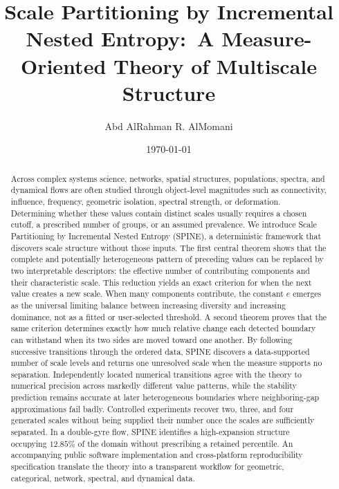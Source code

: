 \documentclass[aip,cha,reprint,superscriptaddress,floatfix]{revtex4-2}
\theoremstyle{definition}
\theoremstyle{remark}
\begin{document}
\title{Scale Partitioning by Incremental Nested Entropy:\ A Measure-Oriented Theory of Multiscale Structure}

\author{Abd AlRahman R. AlMomani}
\date{\today}

\begin{abstract}
Across complex systems science, networks, spatial structures, populations, spectra, and dynamical flows are often studied through object-level magnitudes such as connectivity, influence, frequency, geometric isolation, spectral strength, or deformation. Determining whether these values contain distinct scales usually requires a chosen cutoff, a prescribed number of groups, or an assumed prevalence. We introduce Scale Partitioning by Incremental Nested Entropy (SPINE), a deterministic framework that discovers scale structure without those inputs. The first central theorem shows that the complete and potentially heterogeneous pattern of preceding values can be replaced by two interpretable descriptors: the effective number of contributing components and their characteristic scale. This reduction yields an exact criterion for when the next value creates a new scale. When many components contribute, the constant \(e\) emerges as the universal limiting balance between increasing diversity and increasing dominance, not as a fitted or user-selected threshold. A second theorem proves that the same criterion determines exactly how much relative change each detected boundary can withstand when its two sides are moved toward one another. 
By following successive transitions through the ordered data, SPINE discovers a data-supported number of scale levels and returns one unresolved scale when the measure supports no separation.
Independently located numerical transitions agree with the theory to numerical precision across markedly different value patterns, while the stability prediction remains accurate at later heterogeneous boundaries where neighboring-gap approximations fail badly. Controlled experiments recover two, three, and four generated scales without being supplied their number once the scales are sufficiently separated. In a double-gyre flow, SPINE identifies a high-expansion structure occupying \(12.85\%\) of the domain without prescribing a retained percentile. An accompanying public software implementation and cross-platform reproducibility specification translate the theory into a transparent workflow for geometric, categorical, network, spectral, and dynamical data.
\end{abstract}
\end{document}
